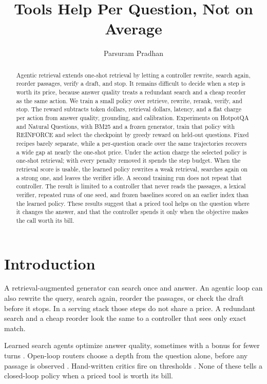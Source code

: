\documentclass[letterpaper]{article} %
\title{Tools Help Per Question, Not on Average}
\author{Parsuram Pradhan}
\begin{document}
\maketitle

\begin{abstract}
Agentic retrieval extends one-shot retrieval by letting a controller rewrite, search again, reorder passages, verify a draft, and stop. It remains difficult to decide when a step is worth its price, because answer quality treats a redundant search and a cheap reorder as the same action. We train a small policy over retrieve, rewrite, rerank, verify, and stop. The reward subtracts token dollars, retrieval dollars, latency, and a flat charge per action from answer quality, grounding, and calibration. Experiments on HotpotQA and Natural Questions, with BM25 and a frozen generator, train that policy with REINFORCE and select the checkpoint by greedy reward on held-out questions. Fixed recipes barely separate, while a per-question oracle over the same trajectories recovers a wide gap at nearly the one-shot price. Under the action charge the selected policy is one-shot retrieval; with every penalty removed it spends the step budget. When the retrieval score is usable, the learned policy rewrites a weak retrieval, searches again on a strong one, and leaves the verifier idle. A second training run does not repeat that controller. The result is limited to a controller that never reads the passages, a lexical verifier, repeated runs of one seed, and frozen baselines scored on an earlier index than the learned policy. These results suggest that a priced tool helps on the question where it changes the answer, and that the controller spends it only when the objective makes the call worth its bill.
\end{abstract}

\section{Introduction}
A retrieval-augmented generator can search once and answer. An agentic loop can also rewrite the query, search again, reorder the passages, or check the draft before it stops. In a serving stack those steps do not share a price. A redundant search and a cheap reorder look the same to a controller that sees only exact match.

Learned search agents optimize answer quality, sometimes with a bonus for fewer turns \cite{jin2025searchr1,gandhi2026grasp}. Open-loop routers choose a depth from the question alone, before any passage is observed \cite{jeong2024adaptive}. Hand-written critics fire on thresholds \cite{asai2024selfrag,yan2024crag}. None of these tells a closed-loop policy when a priced tool is worth its bill.
\end{document}
